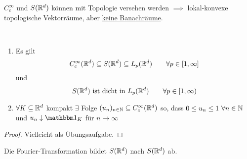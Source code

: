 \begin{bemerkung}
	$C_c^\infty$ und $S(\mathbb{R}^d)$ können mit Topologie versehen werden $\implies$ lokal-konvexe topologische Vektorräume, aber \underline{keine Banachräume}.
\end{bemerkung}

\begin{proposition}\label{proposition7.1}\
	\begin{enumerate}[label=(\alph*)]
		\item Es gilt
		\begin{align*}
			C_c^\infty(\mathbb{R}^d)\subseteq S(\mathbb{R}^d)\subseteq L_p(\mathbb{R}^d)\qquad\forall p\in[1,\infty]
		\end{align*}
		und
		\begin{align*}
			S(\mathbb{R}^d)\text{ ist dicht in }L_p(\mathbb{R}^d)\qquad\forall p\in[1,\infty)
		\end{align*}
		\item $\forall K\subseteq\mathbb{R}^d$ kompakt $\exists$ Folge $(u_n)_{n\in\mathbb{N}}\subseteq C_c^\infty(\mathbb{R}^d)$ so, dass
		$0\leq u_n\leq 1~\forall n\in\mathbb{N}$ und $u_n\downarrow\indi_K$ für $n\to\infty$
	\end{enumerate}
\end{proposition}

\begin{proof}
	Vielleicht als Übungsaufgabe.
\end{proof}

\begin{theorem}\label{theorem7.2}
	Die Fourier-Transformation bildet $S(\mathbb{R}^d)$ nach $S(\mathbb{R}^d)$ ab.
\end{theorem}

